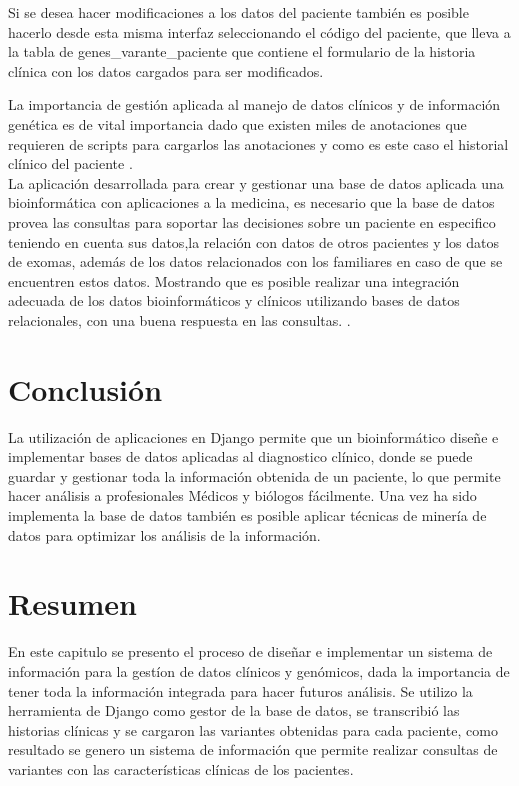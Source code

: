Si se desea hacer modificaciones a los datos del paciente también es posible hacerlo desde esta misma interfaz seleccionando el código del paciente, que lleva a la tabla de genes\_varante\_paciente que contiene el formulario de la historia clínica con los datos cargados para ser modificados. 

La importancia de gestión aplicada al manejo de datos clínicos y de información genética es de vital importancia dado que existen miles de anotaciones que requieren de scripts para cargarlos las anotaciones y como es este caso el historial clínico del paciente \cite{Paila2013}. \\

La aplicación desarrollada para crear y gestionar una base de datos aplicada una bioinformática con aplicaciones a la medicina, es necesario que la base de datos provea las consultas para soportar las decisiones sobre un paciente en especifico teniendo en cuenta sus datos,la relación con datos de otros pacientes y los datos de exomas, además de los datos relacionados con los familiares en caso de que se encuentren estos datos. Mostrando que es posible realizar una integración adecuada de los datos bioinformáticos y clínicos utilizando bases de datos relacionales, con una buena respuesta en las consultas. \cite{Sujansky2001}.

\section{Conclusión}

La utilización de aplicaciones en Django permite que un bioinformático diseñe e implementar bases de datos aplicadas al diagnostico clínico, donde se puede guardar y gestionar toda la información obtenida de un paciente, lo que permite hacer análisis a profesionales Médicos y biólogos fácilmente. Una vez ha sido implementa la base de datos también es posible aplicar técnicas de minería de datos para optimizar los análisis de la información. \\

\section*{Resumen}

En este capitulo se presento el proceso de diseñar e implementar un sistema de información para la gestíon de datos clínicos y genómicos, dada la importancia de tener toda la información integrada para hacer futuros análisis. Se utilizo la herramienta de Django como gestor de la base de datos, se transcribió las historias clínicas y se cargaron las variantes obtenidas para cada paciente, como resultado se genero un sistema de información que permite realizar consultas de variantes con las características clínicas de los pacientes.   